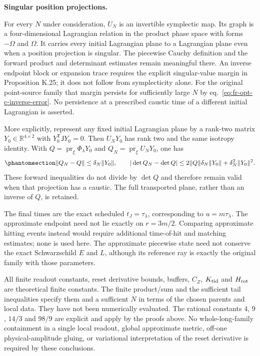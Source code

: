 \documentclass[
  english,
  11pt,
  reqno]{amsart}
\newcounter{none} %
\begin{document}
\protect{}\label{sec:fr-opt-c-scope}

\textbf{Singular position projections.}

For every \(N\) under consideration, \(U_N\) is an invertible symplectic
map. Its graph is a four-dimensional Lagrangian relation in the product
phase space with forms \(-\Omega\) and \(\Omega\). It carries every
initial Lagrangian plane to a Lagrangian plane even when a position
projection is singular. The piecewise Cauchy definition and the forward
product and determinant estimates remain meaningful there. An inverse
endpoint block or expansion trace requires the explicit singular-value
margin in Proposition K.25; it does not follow from symplecticity alone.
For the original point-source family that margin persists for
sufficiently large \(N\) by eq.~\ref{eq:fr-opt-c-inverse-error}. No
persistence at a prescribed caustic time of a different initial
Lagrangian is asserted.

More explicitly, represent any fixed initial Lagrangian plane by a
rank-two matrix \(Y_0\in\mathbb R^{4\times2}\) with
\(Y_0^{\mathsf T}\mathsf JY_0=0\). Then \(U_NY_0\) has rank two and the
same isotropy identity. With
\(Q=\operatorname{pr}_{\xi}\Phi_\lambda Y_0\) and
\(Q_N=\operatorname{pr}_{\xi}U_NY_0\), one has
\begin{equation}\protect\phantomsection\label{eq:fr-opt-c-lagrangian-projection-error}{
 \|Q_N-Q\|\le\delta_N\|Y_0\|,\qquad
 |\det Q_N-\det Q|
 \le2\|Q\|\delta_N\|Y_0\|+\delta_N^2\|Y_0\|^2.
}\end{equation} These forward inequalities do not divide by \(\det Q\)
and therefore remain valid when that projection has a caustic. The full
transported plane, rather than an inverse of \(Q\), is retained.

The final times are the exact scheduled \(t_J=\tau_\lambda\),
corresponding to \(u=m\tau_\lambda\). The approximate endpoint need not
lie exactly on \(r=3m/2\). Comparing approximate hitting events instead
would require additional time-of-hit and matching estimates; none is
used here. The approximate piecewise state need not conserve the exact
Schwarzschild \(E\) and \(L\), although its reference ray is exactly the
original family with those parameters.

All finite readout constants, reset derivative bounds, buffers, \(C_Z\),
\(K_{\rm tid}\) and \(H_{\rm rot}\) are theoretical finite constants.
The finite product/sum and the sufficient tail inequalities specify them
and a sufficient \(N\) in terms of the chosen parents and local data.
They have not been numerically evaluated. The rational constants \(4\),
\(9\), \(14/3\) and \(98/9\) are explicit and apply by the proofs above.
No whole-long-family containment in a single local readout, global
approximate metric, off-one physical-amplitude gluing, or variational
interpretation of the reset derivative is required by these conclusions.
\end{document}
